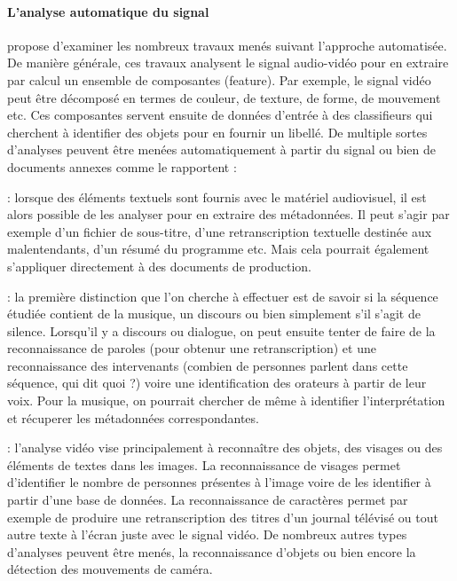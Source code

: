 \paragraph{L'analyse automatique du signal}
\cite{Staab2008} propose d'examiner les nombreux travaux menés suivant l'approche automatisée. 
De manière générale, ces travaux analysent le signal audio-vidéo pour en extraire par calcul un ensemble de composantes (feature).
Par exemple, le signal vidéo peut être décomposé en termes de couleur, de texture, de forme, de mouvement etc. 
Ces composantes servent ensuite de données d'entrée à des classifieurs qui cherchent à identifier des objets pour en fournir un libellé. 
De multiple sortes d'analyses peuvent être menées automatiquement à partir du signal ou bien de documents annexes comme le rapportent \cite[\S 8 : Cataloguing and indexing]{Austerberry2004} : 
\begin{liste}
	\item {} : lorsque des éléments textuels sont fournis avec le matériel audiovisuel, il est alors possible de les analyser pour en extraire des métadonnées. 
	Il peut s'agir par exemple d'un fichier de sous-titre, d'une retranscription textuelle destinée aux malentendants, d'un résumé du programme etc. 
	Mais cela pourrait également s'appliquer directement à des documents de production.

	\item {} : la première distinction que l'on cherche à effectuer est de savoir si la séquence étudiée contient de la musique, un discours ou bien simplement s'il s'agit de silence.
	Lorsqu'il y a discours ou dialogue, on peut ensuite tenter de faire de la reconnaissance de paroles (pour obtenur une retranscription) et une reconnaissance des intervenants (combien de personnes parlent dans cette séquence, qui dit quoi ?) voire une identification des orateurs à partir de leur voix. 
	Pour la musique, on pourrait chercher de même à identifier l'interprétation et récuperer les métadonnées correspondantes. 

	\item {} : l'analyse vidéo vise principalement à reconnaître des objets, des visages ou des éléments de textes dans les images. 
	La reconnaissance de visages permet d'identifier le nombre de personnes présentes à l'image voire de les identifier à partir d'une base de données. 
	La reconnaissance de caractères permet par exemple de produire une retranscription des titres d'un journal télévisé ou tout autre texte à l'écran juste avec le signal vidéo. 
	De nombreux autres types d'analyses peuvent être menés, la reconnaissance d'objets ou bien encore la détection des mouvements de caméra. 
\end{liste}



